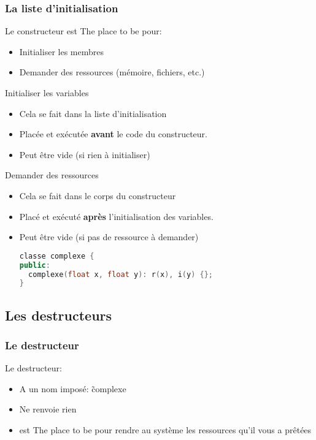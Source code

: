 \documentclass{beamer}
\begin{document}
\begin{frame}[fragile=singleslide,shrink=20]
\frametitle {La liste d'initialisation}
Le constructeur est The place to be pour:
\begin{itemize}
\item{Initialiser les membres}
\item{Demander des ressources (mémoire, fichiers, etc.)}
\end{itemize}

\begin{block}{Initialiser les variables}
\begin{itemize}
\item{Cela se fait dans la liste d'initialisation}
\item{Placée et exécutée \textbf{avant} le code du constructeur.}
\item{Peut être vide (si rien à initialiser)}
\end{itemize}
\end{block}

\begin{block}{Demander des ressources}
\begin{itemize}
\item{Cela se fait dans le corps du constructeur}
\item{Placé et exécuté \textbf{après} l'initialisation des variables.}
\item{Peut être vide (si pas de ressource à demander)}
\begin{lstlisting}[language=c++]
classe complexe {
public:
  complexe(float x, float y): r(x), i(y) {};
}
\end{lstlisting}
\end{itemize}
\end{block}
\end{frame}

\subsection{Les destructeurs}
\begin{frame}[fragile=singleslide,shrink=20]
\frametitle {Le destructeur}
Le destructeur:
\begin{itemize}
\item{A un nom imposé: \~ complexe}
\item{Ne renvoie rien}
\item{est The place to be pour rendre au système les ressources qu'il vous a prêtées}
\end{itemize}
\end{frame}
\end{document}
